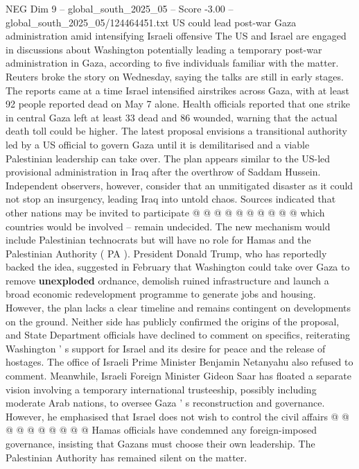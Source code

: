 \begin{textsample}{NEG Dim 9 – global\_south\_2025\_05 – Score -3.00 – global\_south\_2025\_05/124464451.txt}  \label{ex:f9_neg_246}
US could lead post-war Gaza administration amid intensifying Israeli offensive The US and Israel are engaged in discussions about Washington potentially leading a temporary post-war administration in Gaza, according to five individuals familiar with the matter.
Reuters broke the story on Wednesday, saying the talks are still in early stages.
The reports came at a time Israel intensified airstrikes across Gaza, with at least 92 people reported dead on May 7 alone.
Health officials reported that one strike in central Gaza left at least 33 dead and 86 wounded, warning that the actual death toll could be higher.
The latest proposal envisions a transitional authority led by a US official to govern Gaza until it is demilitarised and a viable Palestinian leadership can take over.
The plan appears similar to the US-led provisional administration in Iraq after the overthrow of Saddam Hussein.
Independent observers, however, consider that an unmitigated disaster as it could not stop an insurgency, leading Iraq into untold chaos.
Sources indicated that other nations may be invited to participate @ @ @ @ @ @ @ @ @ @ which countries would be involved -- remain undecided.
The new mechanism would include Palestinian technocrats but will have no role for Hamas and the Palestinian Authority ( PA ).
President Donald Trump, who has reportedly backed the idea, suggested in February that Washington could take over Gaza to remove \textbf{unexploded} ordnance, demolish ruined infrastructure and launch a broad economic redevelopment programme to generate jobs and housing.
However, the plan lacks a clear timeline and remains contingent on developments on the ground.
Neither side has publicly confirmed the origins of the proposal, and State Department officials have declined to comment on specifics, reiterating Washington ' s support for Israel and its desire for peace and the release of hostages.
The office of Israeli Prime Minister Benjamin Netanyahu also refused to comment.
Meanwhile, Israeli Foreign Minister Gideon Saar has floated a separate vision involving a temporary international trusteeship, possibly including moderate Arab nations, to oversee Gaza ' s reconstruction and governance.
However, he emphasised that Israel does not wish to control the civil affairs @ @ @ @ @ @ @ @ @ @ Hamas officials have condemned any foreign-imposed governance, insisting that Gazans must choose their own leadership.
The Palestinian Authority has remained silent on the matter.

\end{textsample}
